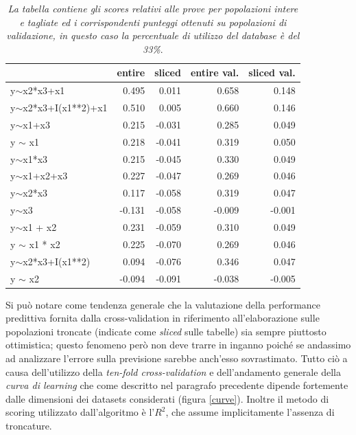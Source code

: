 \documentclass[12pt,openright,twoside,a4paper]{book}
\begin{document}
\begin{table}[!h]
\begin{tabular}{lrrrr}
\toprule
{} &  entire &  sliced &  entire val. &  sliced val. \\
\midrule
y$\sim$x2*x3+x1          &         0.495 &         0.011 &             0.658 &             0.148 \\
y$\sim$x2*x3+I(x1**2)+x1 &         0.510 &         0.005 &             0.660 &             0.146 \\
y$\sim$x1+x3             &         0.215 &        -0.031 &             0.285 &             0.049 \\
y $\sim$ x1              &         0.218 &        -0.041 &             0.319 &             0.050 \\
y$\sim$x1*x3             &         0.215 &        -0.045 &             0.330 &             0.049 \\
y$\sim$x1+x2+x3          &         0.227 &        -0.047 &             0.269 &             0.046 \\
y$\sim$x2*x3             &         0.117 &        -0.058 &             0.319 &             0.047 \\
y$\sim$x3                &        -0.131 &        -0.058 &            -0.009 &            -0.001 \\
y$\sim$x1 + x2           &         0.231 &        -0.059 &             0.310 &             0.049 \\
y $\sim$ x1 * x2         &         0.225 &        -0.070 &             0.269 &             0.046 \\
y$\sim$x2*x3+I(x1**2)    &         0.094 &        -0.076 &             0.346 &             0.047 \\
y $\sim$ x2              &        -0.094 &        -0.091 &            -0.038 &            -0.005 \\
\bottomrule
\end{tabular}
\caption{\textit{La tabella contiene gli scores relativi alle prove per popolazioni intere e tagliate ed i corrispondenti punteggi  ottenuti su popolazioni di validazione, in questo caso la percentuale di utilizzo del database è del 33\%}.}
\end{table}

\pagebreak

Si può notare come tendenza generale che la valutazione della performance predittiva fornita dalla cross-validation in riferimento all'elaborazione sulle popolazioni troncate (indicate come \textit{sliced} sulle tabelle) sia sempre piuttosto ottimistica; questo fenomeno però non deve trarre in inganno poiché se andassimo ad analizzare l'errore sulla previsione sarebbe anch'esso sovrastimato.
Tutto ciò a causa dell'utilizzo della \textit{ten-fold cross-validation} e dell'andamento generale della \textit{ curva di learning} che come descritto nel paragrafo precedente dipende fortemente dalle dimensioni dei datasets considerati (figura \ref{curve}).
Inoltre il metodo di scoring utilizzato dall'algoritmo è l'$R^2$, che assume implicitamente l'assenza di troncature.
\end{document}
